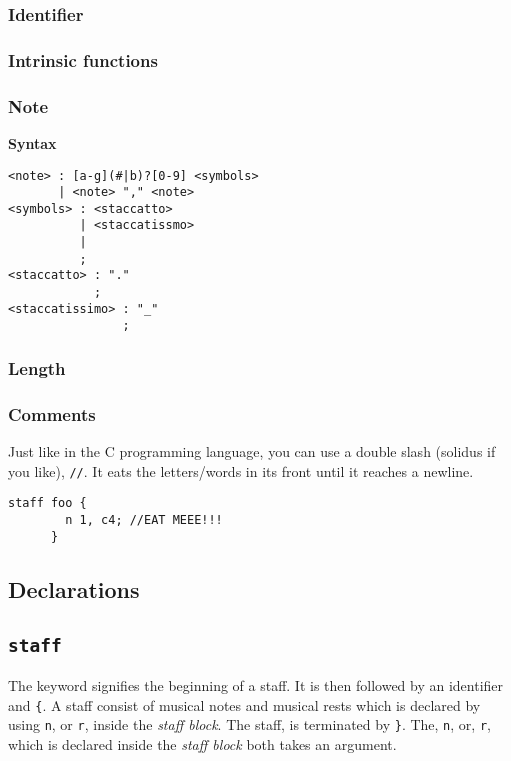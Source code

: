 \subsubsection{Identifier}


\subsubsection{Intrinsic functions}

\subsubsection{Note}

\np \textbf{Syntax}

\begin{verbatim}
<note> : [a-g](#|b)?[0-9] <symbols>
       | <note> "," <note>
<symbols> : <staccatto>
          | <staccatissmo>
          |
          ;
<staccatto> : "."
            ;
<staccatissimo> : "_"
                ;
\end{verbatim}

\subsubsection{Length}

\subsubsection{Comments}
\np Just like in the C programming language, you can use a double slash (solidus if you like), \verb+//+.
It eats the letters/words in its front until it reaches a newline.
\begin{Verbatim}[frame=single]
      staff foo {
        n 1, c4; //EAT MEEE!!!
      }
\end{Verbatim}

\subsection{Declarations}

\subsection{\texttt{staff}}
\np The  keyword signifies the beginning of a staff. It is then followed by an identifier and \verb+{+. A staff consist of
musical notes and musical rests which is declared by using \verb+n+, or \verb+r+, inside the \textit{staff block}.
The staff, is terminated by \verb+}+. The, \verb+n+, or, \verb+r+, which is declared inside the \textit{staff block} both takes an argument.

